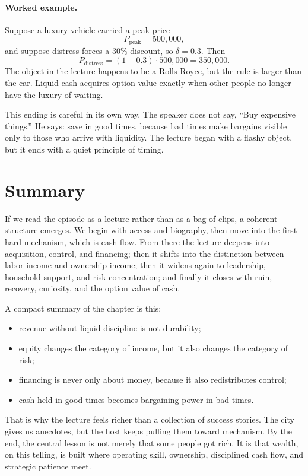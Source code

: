 \paragraph{Worked example.} Suppose a luxury vehicle carried a peak price
\[
P_{\mathrm{peak}} = 500{,}000,
\]
and suppose distress forces a \(30\%\) discount, so \(\delta=0.3\). Then
\begin{equation}
P_{\mathrm{distress}} = (1-0.3)\cdot 500{,}000 = 350{,}000.
\end{equation}
The object in the lecture happens to be a Rolls Royce, but the rule is larger than the car. Liquid cash acquires option value exactly when other people no longer have the luxury of waiting.

This ending is careful in its own way. The speaker does not say, ``Buy expensive things.'' He says: save in good times, because bad times make bargains visible only to those who arrive with liquidity. The lecture began with a flashy object, but it ends with a quiet principle of timing.

\section{Summary}

If we read the episode as a lecture rather than as a bag of clips, a coherent structure emerges. We begin with access and biography, then move into the first hard mechanism, which is cash flow. From there the lecture deepens into acquisition, control, and financing; then it shifts into the distinction between labor income and ownership income; then it widens again to leadership, household support, and risk concentration; and finally it closes with ruin, recovery, curiosity, and the option value of cash.

A compact summary of the chapter is this:
\begin{itemize}
\item revenue without liquid discipline is not durability;
\item equity changes the category of income, but it also changes the category of risk;
\item financing is never only about money, because it also redistributes control;
\item cash held in good times becomes bargaining power in bad times.
\end{itemize}

That is why the lecture feels richer than a collection of success stories. The city gives us anecdotes, but the host keeps pulling them toward mechanism. By the end, the central lesson is not merely that some people got rich. It is that wealth, on this telling, is built where operating skill, ownership, disciplined cash flow, and strategic patience meet.